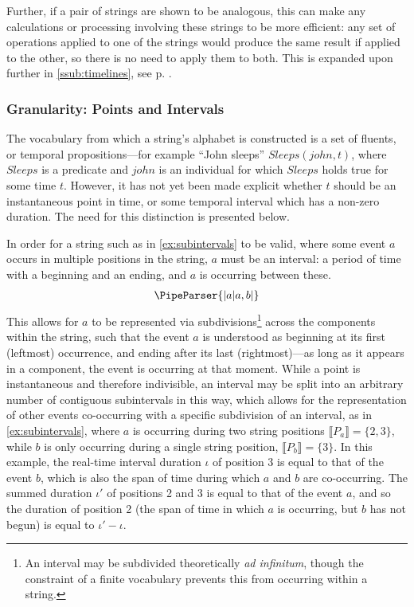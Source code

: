 \documentclass[a4paper,12pt,leqno]{article}
\newcommand{\vph}[1]{\vphantom{#1}}
\newcommand{\ebox}[1]{\fbox{$\vph{'(),}#1$}}
\newcommand{\EventString}[1]{%
	\renewcommand*{\do}[1]{\ebox{##1}}%
	\PipeParser{#1}%
}
\begin{document}
Further, if a pair of strings are shown to be analogous, this can make any calculations or processing involving these strings to be more efficient: any set of operations applied to one of the strings would produce the same result if applied to the other, so there is no need to apply them to both. This is expanded upon further in \cref{ssub:timelines}, see p. \pageref{ex:sp-analogy}.

\subsubsection{Granularity: Points and Intervals}\label{ssub:granularity}
The vocabulary from which a string's alphabet is constructed is a set of fluents, or temporal propositions---for example ``John sleeps'' $Sleeps(john, t)$, where $Sleeps$ is a predicate and $john$ is an individual for which $Sleeps$ holds true for some time $t$. However, it has not yet been made explicit whether $t$ should be an instantaneous point in time, or some temporal interval which has a non-zero duration. The need for this distinction is presented below.

In order for a string such as in \cref{ex:subintervals} to be valid, where some event $a$ occurs in multiple positions in the string, $a$ must be an interval: a period of time with a beginning and an ending, and $a$ is occurring between these.
\begin{align}\label{ex:subintervals}
	\EventString{{}|a|a,b|{}}
\end{align}
This allows for $a$ to be represented via subdivisions\footnote{An interval may be subdivided theoretically \textit{ad infinitum}, though the constraint of a finite vocabulary prevents this from occurring within a string.} across the components within the string, such that the event $a$ is understood as beginning at its first (leftmost) occurrence, and ending after its last (rightmost)---as long as it appears in a component, the event is occurring at that moment. While a point is instantaneous and therefore indivisible, an interval may be split into an arbitrary number of contiguous subintervals in this way, which allows for the representation of other events co-occurring with a specific subdivision of an interval, as in \cref{ex:subintervals}, where $a$ is occurring during two string positions $\llbracket P_a \rrbracket = \{2, 3\}$, while $b$ is only occurring during a single string position, $\llbracket P_b \rrbracket = \{3\}$. In this example, the real-time interval duration $\iota$ of position 3 is equal to that of the event $b$, which is also the span of time during which $a$ and $b$ are co-occurring. The summed duration $\iota'$ of positions 2 and 3 is equal to that of the event $a$, and so the duration of position 2 (the span of time in which $a$ is occurring, but $b$ has not begun) is equal to $\iota' - \iota$.
\end{document}

